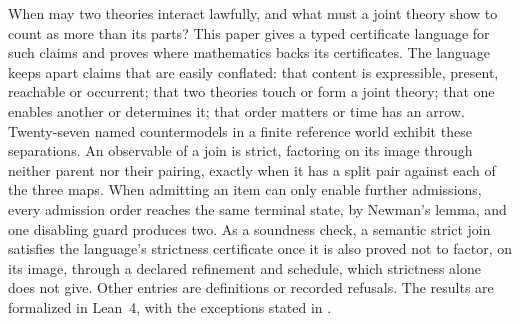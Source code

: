 When may two theories interact lawfully, and what must a joint theory show to count as
more than its parts? This paper gives a typed certificate language for such claims and
proves where mathematics backs its certificates. The language keeps apart claims
that are easily conflated: that content is expressible, present, reachable or occurrent;
that two theories touch or form a joint theory; that one enables another or determines
it; that order matters or time has an arrow. Twenty-seven named
countermodels in a finite reference world exhibit these separations. An observable of a join is strict, factoring on its image through
neither parent nor their pairing, exactly when it has a split pair against each of the three maps. When admitting an item can only
enable further admissions, every admission order reaches the same terminal state, by
Newman's lemma, and one disabling guard produces two. As a soundness check, a semantic strict join
satisfies the language's strictness certificate once it is also proved not to factor, on
its image, through a declared refinement and schedule, which strictness alone does not
give. Other entries are definitions or recorded refusals. The results are formalized in Lean~4, with
the exceptions stated in .
